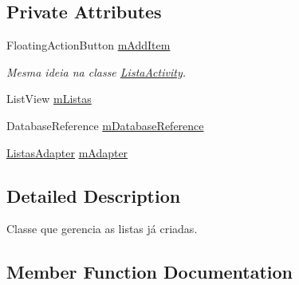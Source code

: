 \subsection*{Private Attributes}
\begin{DoxyCompactItemize}
\item 
Floating\+Action\+Button \mbox{\hyperlink{classbr_1_1unb_1_1cic_1_1mp_1_1marketmaster_1_1GerenciarListasActivity_afff8c9c7b7aca4dbccd9669665d84aa8}{m\+Add\+Item}}
\begin{DoxyCompactList}\small\item\em Mesma ideia na classe \mbox{\hyperlink{classbr_1_1unb_1_1cic_1_1mp_1_1marketmaster_1_1ListaActivity}{Lista\+Activity}}. \end{DoxyCompactList}\item 
List\+View \mbox{\hyperlink{classbr_1_1unb_1_1cic_1_1mp_1_1marketmaster_1_1GerenciarListasActivity_a0fdef308d798ed86885db16fc7ff9bc5}{m\+Listas}}
\item 
Database\+Reference \mbox{\hyperlink{classbr_1_1unb_1_1cic_1_1mp_1_1marketmaster_1_1GerenciarListasActivity_af847d7040999469d679a638c1ef18b57}{m\+Database\+Reference}}
\item 
\mbox{\hyperlink{classbr_1_1unb_1_1cic_1_1mp_1_1marketmaster_1_1ListasAdapter}{Listas\+Adapter}} \mbox{\hyperlink{classbr_1_1unb_1_1cic_1_1mp_1_1marketmaster_1_1GerenciarListasActivity_a1bc7681fd197de586855b8a735bc55e0}{m\+Adapter}}
\end{DoxyCompactItemize}


\subsection{Detailed Description}
Classe que gerencia as listas já criadas. 

\subsection{Member Function Documentation}
\mbox{\label{classbr_1_1unb_1_1cic_1_1mp_1_1marketmaster_1_1GerenciarListasActivity_abf13a16e07d4d806acf480475fca99ad}} 
